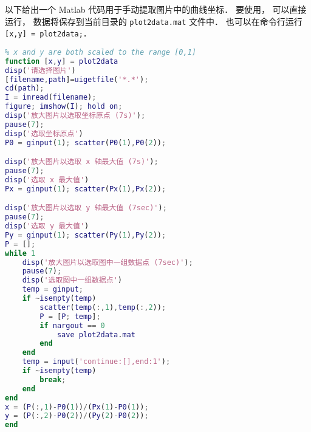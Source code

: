 

以下给出一个 Matlab 代码用于手动提取图片中的曲线坐标． 要使用， 可以直接运行， 数据将保存到当前目录的 \verb|plot2data.mat| 文件中． 也可以在命令行运行 \verb|[x,y] = plot2data;|．

\begin{lstlisting}[language=matlab]
% Data Extractor for Plot
% x and y are both scaled to the range [0,1]
function [x,y] = plot2data
disp('请选择图片')
[filename,path]=uigetfile('*.*');
cd(path);
I = imread(filename);
figure; imshow(I); hold on;
disp('放大图片以选取坐标原点 (7s)');
pause(7);
disp('选取坐标原点')
P0 = ginput(1); scatter(P0(1),P0(2));

disp('放大图片以选取 x 轴最大值 (7s)');
pause(7);
disp('选取 x 最大值')
Px = ginput(1); scatter(Px(1),Px(2));

disp('放大图片以选取 y 轴最大值 (7sec)');
pause(7);
disp('选取 y 最大值')
Py = ginput(1); scatter(Py(1),Py(2));
P = [];
while 1
    disp('放大图片以选取图中一组数据点 (7sec)');
    pause(7);
    disp('选取图中一组数据点')
    temp = ginput;
    if ~isempty(temp)
        scatter(temp(:,1),temp(:,2));
        P = [P; temp];
        if nargout == 0
            save plot2data.mat
        end
    end
    temp = input('continue:[],end:1');
    if ~isempty(temp)
        break;
    end
end
x = (P(:,1)-P0(1))/(Px(1)-P0(1));
y = (P(:,2)-P0(2))/(Py(2)-P0(2));
end
\end{lstlisting}
